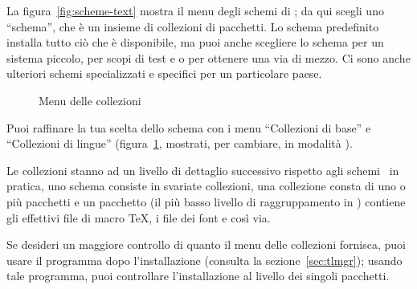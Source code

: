 \documentclass{article}
\begin{document}
La figura~\ref{fig:scheme-text} mostra il menu degli schemi di \TL; da qui
scegli uno ``schema'', che è un insieme di collezioni di pacchetti. Lo
schema predefinito  installa tutto ciò che è disponibile, ma
puoi anche scegliere lo schema  per un sistema piccolo,
 per scopi di test e  o 
per ottenere una via di mezzo. Ci sono anche ulteriori schemi
specializzati e specifici per un particolare paese.

\begin{figure}[tbh]
\caption{Menu delle collezioni}\label{fig:collections-gui}
\end{figure}

Puoi raffinare la tua scelta dello schema con i menu ``Collezioni di
base'' e ``Collezioni di lingue'' (figura~\ref{fig:collections-gui},
mostrati, per cambiare, in modalità \GUI).

Le collezioni stanno ad un livello di dettaglio successivo rispetto agli
schemi \Dash\ in pratica, uno schema consiste in svariate collezioni, una
collezione consta di uno o più pacchetti e un pacchetto (il più basso
livello di raggruppamento in \TL) contiene gli effettivi file di macro
\TeX, i file dei font e così via.

Se desideri un maggiore controllo di quanto il menu delle collezioni
fornisca, puoi usare il programma  dopo l'installazione
(consulta la sezione~\ref{sec:tlmgr}); usando tale programma, puoi
controllare l'installazione al livello dei singoli pacchetti.
\end{document}
